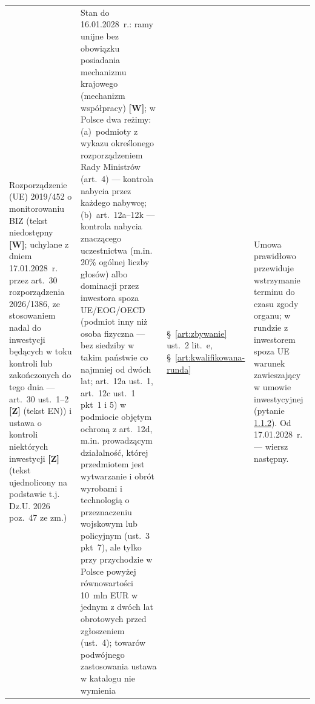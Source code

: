 \documentclass[12pt,a4paper]{report}
\newcommand{\Wiar}[1]{\textbf{[#1]}}
\begin{document}
\begin{longtable}{@{}p{3.1cm} p{3.7cm} p{3.3cm} p{4.4cm}@{}}
Rozporządzenie (UE) 2019/452 o monitorowaniu BIZ (tekst niedostępny \Wiar{W}; uchylane z dniem 17.01.2028~r. przez art.~30 rozporządzenia 2026/1386, ze stosowaniem nadal do inwestycji będących w toku kontroli lub zakończonych do tego dnia --- art.~30 ust.~1--2 \Wiar{Z} (tekst EN)) i ustawa o kontroli niektórych inwestycji \Wiar{Z} (tekst ujednolicony na podstawie t.j. Dz.U. 2026 poz.~47 ze zm.) & Stan do 16.01.2028~r.: ramy unijne bez obowiązku posiadania mechanizmu krajowego (mechanizm współpracy) \Wiar{W}; w Polsce dwa reżimy: (a)~podmioty z wykazu określonego rozporządzeniem Rady Ministrów (art.~4) --- kontrola nabycia przez każdego nabywcę; (b)~art.~12a--12k --- kontrola nabycia znaczącego uczestnictwa (m.in. 20\% ogólnej liczby głosów) albo dominacji przez inwestora spoza UE/EOG/OECD (podmiot inny niż osoba fizyczna --- bez siedziby w takim państwie co najmniej od dwóch lat; art.~12a ust.~1, art.~12c ust.~1 pkt~1 i 5) w podmiocie objętym ochroną z art.~12d, m.in. prowadzącym działalność, której przedmiotem jest wytwarzanie i obrót wyrobami i technologią o przeznaczeniu wojskowym lub policyjnym (ust.~3 pkt~7), ale tylko przy przychodzie w Polsce powyżej równowartości 10~mln EUR w jednym z dwóch lat obrotowych przed zgłoszeniem (ust.~4); towarów podwójnego zastosowania ustawa w katalogu nie wymienia & §~\ref{art:zbywanie} ust.~2 lit.~e, §~\ref{art:kwalifikowana-runda} & Umowa prawidłowo przewiduje wstrzymanie terminu do czasu zgody organu; w rundzie z inwestorem spoza UE warunek zawieszający w umowie inwestycyjnej (pytanie \hyperref[memo:1.1.2]{1.1.2}). Od 17.01.2028~r. --- wiersz następny. \\

\end{longtable}
\end{document}
